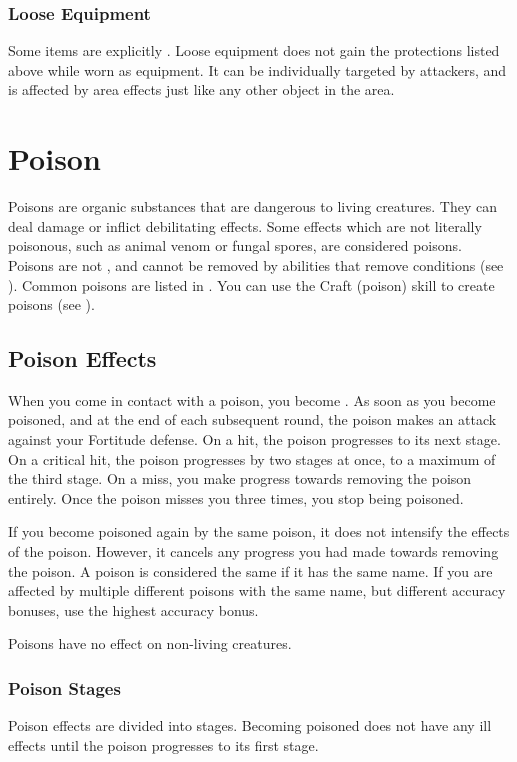     \subsubsection{Loose Equipment}
      Some items are explicitly .
      Loose equipment does not gain the protections listed above while worn as equipment.
      It can be individually targeted by attackers, and is affected by area effects just like any other object in the area.

\section{Poison}\label{Poison}
  Poisons are organic substances that are dangerous to living creatures.
  They can deal damage or inflict debilitating effects.
  Some effects which are not literally poisonous, such as animal venom or fungal spores, are considered poisons.
  Poisons are not , and cannot be removed by abilities that remove conditions (see ).
  Common poisons are listed in .
  You can use the Craft (poison) skill to create poisons (see ).

  \subsection{Poison Effects}\label{Poison Effects}
    When you come in contact with a poison, you become .
    As soon as you become poisoned, and at the end of each subsequent round, the poison makes an attack against your Fortitude defense.
    On a hit, the poison progresses to its next stage.
    On a critical hit, the poison progresses by two stages at once, to a maximum of the third stage.
    On a miss, you make progress towards removing the poison entirely.
    Once the poison misses you three times, you stop being poisoned.

    If you become poisoned again by the same poison, it does not intensify the effects of the poison.
    However, it cancels any progress you had made towards removing the poison.
    A poison is considered the same if it has the same name.
    If you are affected by multiple different poisons with the same name, but different accuracy bonuses, use the highest accuracy bonus.

    Poisons have no effect on non-living creatures.

    \subsubsection{Poison Stages}
      Poison effects are divided into stages.
      Becoming poisoned does not have any ill effects until the poison progresses to its first stage.

